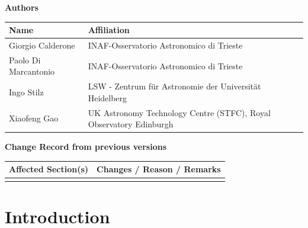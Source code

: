 \documentclass[12pt,a4paper]{article}
\begin{document}

\esoheader{}

\noindent
{\Large \bf Authors}
\medskip

\noindent
\begin{tabular}{ |p{}|p{}| }
  \hline
      {\bf Name} & {\bf Affiliation}\\
      \hline
      Giorgio Calderone     & INAF-Osservatorio Astronomico di Trieste \\
      Paolo Di Marcantonio  & INAF-Osservatorio Astronomico di Trieste \\
      Ingo Stilz            & LSW - Zentrum für Astronomie der Universität Heidelberg \\
      Xiaofeng Gao          & UK Astronomy Technology Centre (STFC), Royal Observatory Edinburgh\\
      \hline
\end{tabular}

\vspace{3cm}

\noindent
{\Large \bf Change Record from previous versions}
\medskip

\noindent
\begin{tabular}{ |p{}|p{}| }
  \hline
      {\bf Affected Section(s)} & {\bf Changes / Reason / Remarks}\\
      \hline
       & \\
      \hline
\end{tabular}

\newpage

\tableofcontents

\newpage

\section{Introduction}
\end{document}
